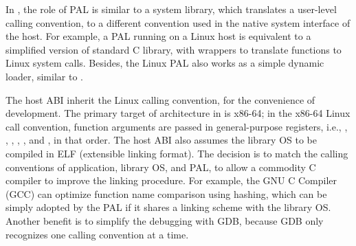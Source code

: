 In \graphene{}, the role of PAL is similar to a system library,
which translates a user-level calling convention,
to a different convention used in the native system interface of the host.
For example, a PAL running on a Linux host
is equivalent to a simplified version of standard C library, with wrappers to
translate functions to Linux system calls.
Besides, the Linux PAL also works as a simple dynamic loader, similar to .
















The host ABI inherit the Linux calling convention,
for the convenience of development.
The primary target of architecture in \graphene{} is x86-64;
in the x86-64 Linux call convention,
function arguments are passed in general-purpose registers, i.e., , , , , , and , in that order.
The host ABI also assumes the library OS to be compiled in ELF (extensible linking format).
The decision is to match the calling conventions
of application, library OS, and PAL,
to allow a commodity C compiler to improve the linking procedure.
For example, the GNU C Compiler (GCC) can optimize function name comparison
using hashing,
which can be simply adopted by the PAL
if it shares a linking scheme with the library OS.
Another benefit is to simplify the debugging with GDB, because GDB only recognizes one calling convention at a time.








